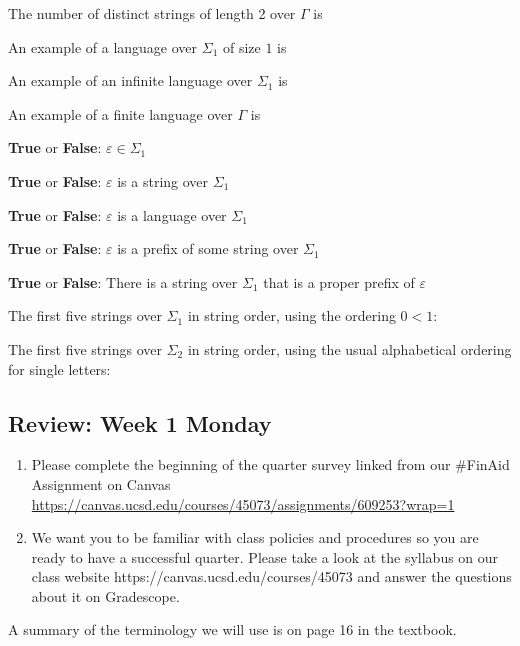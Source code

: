 \documentclass[12pt, oneside]{article}
\begin{document}
The number of distinct strings of length 2 over $\Gamma$ is  \underline{\phantom{ $25$} \hspace{0.2in}}

An example of a language over $\Sigma_1$ of size $1$ is  \underline{\phantom{ $ \{ \varepsilon \} $} \hspace{0.2in}}

An example of an infinite language over $\Sigma_1$ is  \underline{\phantom{ $\Sigma^*$} \hspace{0.2in}}
    
An example of  a finite language over $\Gamma$ is  \underline{ \hspace{0.2in}}
    
{\bf True} or {\bf False}: $\varepsilon \in \Sigma_1$

{\bf True} or {\bf False}: $\varepsilon$ is  a string over $\Sigma_1$

{\bf True} or {\bf False}: $\varepsilon$ is a language over $\Sigma_1$

{\bf True} or {\bf False}: $\varepsilon$ is a prefix of some string over  $\Sigma_1$

{\bf True} or {\bf False}: There is a string over $\Sigma_1$ that is a proper prefix of $\varepsilon$
    

The first five strings over $\Sigma_1$ in string order, using the ordering $0 <  1$: \vfill
    
The first five strings over $\Sigma_2$ in string order, using the usual alphabetical ordering for single letters: \vfill
     
\newpage
\subsection*{Review: Week 1 Monday}
\begin{enumerate}
\item Please complete the beginning of the quarter survey linked from our \#FinAid
Assignment on Canvas \href{https://canvas.ucsd.edu/courses/45073/assignments/609253}{https://canvas.ucsd.edu/courses/45073/assignments/609253?wrap=1}
\item We want you to be familiar with class policies and procedures so you are ready to have a successful quarter. 
Please take a look at the syllabus on our class website https://canvas.ucsd.edu/courses/45073
and answer the questions about it on Gradescope.
\end{enumerate}

A summary of the terminology we will use is on page 16 in the textbook.
\end{document}
